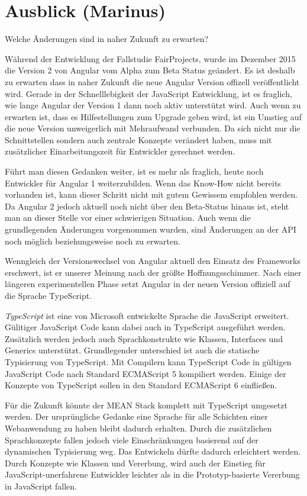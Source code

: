 \chapter{Ausblick (Marinus)}\label{ausblick-marinus}

Welche Änderungen sind in naher Zukunft zu erwarten?

Während der Entwicklung der Fallstudie FairProjects, wurde im Dezember
2015 die Version 2 von Angular vom Alpha zum Beta Status geändert. Es
ist deshalb zu erwarten dass in naher Zukunft die neue Angular Version
offizell veröffentlicht wird. Gerade in der Schnelllebigkeit der
JavaScript Entwicklung, ist es fraglich, wie lange Angular der Version 1
dann noch aktiv unterstützt wird. Auch wenn zu erwarten ist, dass es
Hilfestellungen zum Upgrade geben wird, ist ein Umstieg auf die neue
Version unweigerlich mit Mehraufwand verbunden. Da sich nicht nur die
Schnittstellen sondern auch zentrale Konzepte verändert haben, muss mit
zusätzlicher Einarbeitungszeit für Entwickler gerechnet werden.

Führt man diesen Gedanken weiter, ist es mehr als fraglich, heute noch
Entwickler für Angular 1 weiterzubilden. Wenn das Know-How nicht bereits
vorhanden ist, kann dieser Schritt nicht mit gutem Gewissem empfohlen
werden. Da Angular 2 jedoch aktuell noch nicht über den Beta-Status
hinaus ist, steht man an dieser Stelle vor einer schwierigen Situation.
Auch wenn die grundlegenden Änderungen vorgenommen wurden, sind
Änderungen an der API noch möglich beziehungsweise noch zu erwarten.

Wenngleich der Versionswechsel von Angular aktuell den Einsatz des
Frameworks erschwert, ist er unserer Meinung nach der größte
Hoffnungsschimmer. Nach einer längeren experimentellen Phase setzt
Angular in der neuen Version offiziell auf die Sprache TypeScript.

\emph{TypeScript} ist eine von Microsoft entwickelte Sprache die
JavaScript erweitert. Gülitiger JavaScript Code kann dabei auch in
TypeScript ausgeführt werden. Zusätzlich werden jedoch auch
Sprachkonstrukte wie Klassen, Interfaces und Generics unterstützt.
Grundlegender unterschied ist auch die statische Typisierung von
TypeScript. Mit Compilern kann TypeScript Code in gültigen JavaScript
Code nach Standard ECMAScript 5 kompiliert werden. Einige der Konzepte
von TypeScript sollen in den Standard ECMAScript 6 einfließen.

Für die Zukunft könnte der MEAN Stack komplett mit TypeScript umgesetzt
werden. Der ursprüngliche Gedanke eine Sprache für alle Schichten einer
Webanwendung zu haben bleibt dadurch erhalten. Durch die zusätzlichen
Sprachkonzepte fallen jedoch viele Einschränkungen basierend auf der
dynamischen Typisierung weg. Das Entwickeln dürfte dadurch erleichtert
werden. Durch Konzepte wie Klassen und Vererbung, wird auch der Einstieg
für JavaScript-unerfahrene Entwickler leichter als in die
Prototyp-basierte Vererbung in JavaScript fallen.

